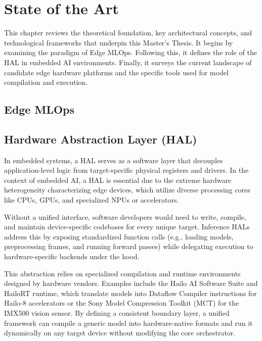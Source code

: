 \chapter{State of the Art}\label{ch:sota}

This chapter reviews the theoretical foundation, key architectural concepts, and technological frameworks that underpin this Master's Thesis. It begins by examining the paradigm of Edge \gls{MLOps}. Following this, it defines the role of the \gls{HAL} in embedded AI environments. Finally, it surveys the current landscape of candidate edge hardware platforms and the specific tools used for model compilation and execution.

\section{Edge \acrshort{MLOps}}\label{sec:sota:mlops}


\section{Hardware Abstraction Layer (\acrshort{HAL})}\label{sec:sota:hal}

In embedded systems, a \gls{HAL} serves as a software layer that decouples application-level logic from target-specific physical registers and drivers. In the context of embedded \gls{AI}, a \gls{HAL} is essential due to the extreme hardware heterogeneity characterizing edge devices, which utilize diverse processing cores like \glspl{CPU}, \glspl{GPU}, and specialized \glspl{NPU} or accelerators.

Without a unified interface, software developers would need to write, compile, and maintain device-specific codebases for every unique target. Inference \glspl{HAL} address this by exposing standardized function calls (e.g., loading models, preprocessing frames, and running forward passes) while delegating execution to hardware-specific backends under the hood. 

This abstraction relies on specialized compilation and runtime environments designed by hardware vendors. Examples include the Hailo \gls{AI} Software Suite and HailoRT runtime, which translate models into Dataflow Compiler instructions for Hailo-8 accelerators or the Sony Model Compression Toolkit (MCT) for the IMX500 vision sensor. By defining a consistent boundary layer, a unified framework can compile a generic model into hardware-native formats and run it dynamically on any target device without modifying the core orchestrator.


